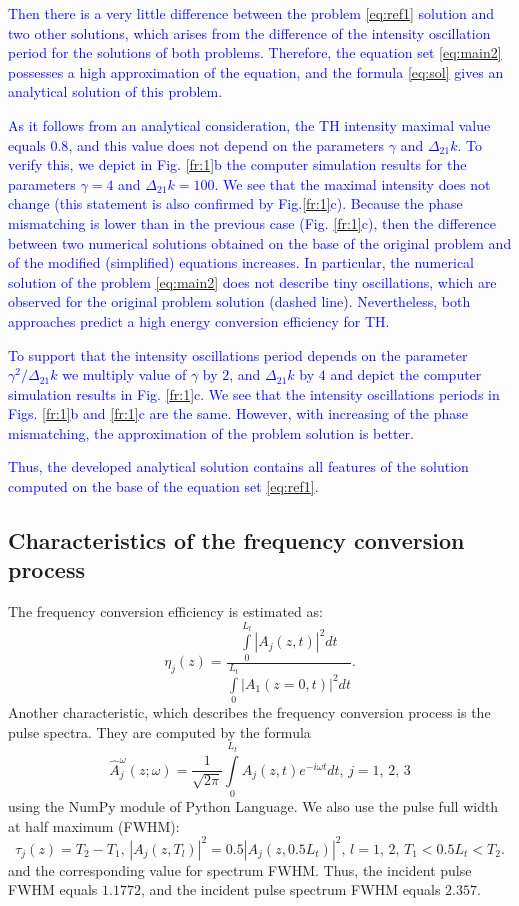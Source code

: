 \documentclass[a4paper, 12pt, onecolumn]{extarticle}
\begin{document}
\textcolor{blue}{
Then there is a very little difference between the problem \eqref{eq:ref1} solution and two other solutions, which arises from the difference of the intensity oscillation period for the solutions of both problems. Therefore, the equation set \eqref{eq:main2} possesses a high approximation of the equation, and the formula \eqref{eq:sol} gives an analytical solution of this problem.
}

\textcolor{blue}{
As it follows from an analytical consideration, the TH intensity maximal value equals \(0.8\), and this value does not depend on the parameters \(\gamma\) and \(\Delta_{21}k\). To verify this, we depict in Fig. \ref{fr:1}b the computer simulation results for the parameters \(\gamma=4\) and \(\Delta_{21}k=100\). We see that the maximal intensity does not change (this statement is also confirmed by Fig.\ref{fr:1}c). Because the phase mismatching is lower than in the previous case (Fig. \ref{fr:1}c), then the difference between two numerical solutions obtained on the base of the original problem and of the modified (simplified) equations increases. In particular, the numerical solution of the problem \eqref{eq:main2} does not describe tiny oscillations, which are observed for the original problem solution (dashed line). Nevertheless, both approaches predict a high energy conversion efficiency for TH.
}

\textcolor{blue}{
To support that the intensity oscillations period depends on the parameter \(\gamma^2/\Delta_{21}k\) we multiply value of \(\gamma\) by \(2\), and \(\Delta_{21}k\) by \(4\) and depict the computer simulation results in Fig. \ref{fr:1}c. We see that the intensity oscillations periods in Figs. \ref{fr:1}b and \ref{fr:1}c are the same. However, with increasing of the phase mismatching, the approximation of the problem solution is better.
}

\textcolor{blue}
{
Thus, the developed analytical solution contains all features of the solution computed on the base of the equation set \eqref{eq:ref1}.
}

\subsection*{Characteristics of the frequency conversion process}
The frequency conversion efficiency is estimated as:
\begin{equation}
\eta_j(z)=\frac{\int\limits_0^{L_t}|A_j(z,t)|^2dt}{\int\limits_0^{L_t}|A_1(z=0,t)|^2dt}.
\end{equation}
Another characteristic, which describes the frequency conversion process is the pulse spectra. They are computed by the formula
\begin{equation}
\hat{A}_j^\omega(z;\omega)=\frac{1}{\sqrt{2\pi}}\int\limits_{0}^{L_t} A_j(z,t)e^{-i\omega t}dt,\,j=1,\,2,\,3
\end{equation}
using the NumPy module \cite{bib:np} of Python Language. We also use the pulse full width at half maximum (FWHM):
\[\tau_j(z)=T_2-T_1,\, |A_j(z,T_l)|^2=0.5|A_j(z,0.5L_t)|^2,\,l=1,\,2,\,T_1<0.5L_t<T_2.\]
 and the corresponding value for spectrum FWHM. Thus, the incident pulse FWHM equals \(1.1772\), and the incident pulse spectrum FWHM equals \(2.357\).
\end{document}

